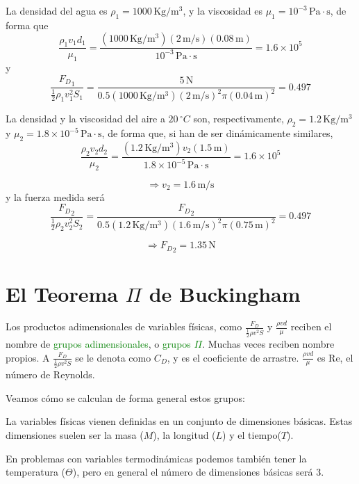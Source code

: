 		La densidad del agua es $\rho_{1}=1000\,\text{Kg}/\text{m}^{3}$,
		y la viscosidad es $\mu_{1}=10^{-3}\,\text{Pa}\cdot\text{s}$, de
		forma que 
		\[
		\frac{\rho_{1}v_{1}d_{1}}{\mu_{1}}=\frac{(1000\,\text{Kg}/\text{m}^{3})(2\,\text{m/s})(0.08\,\text{m})}{10^{-3}\,\text{Pa}\cdot\text{s}}=1.6\times10^{5}
		\]
		y 
		\[
		\frac{{F_{D}}_{1}}{\frac{1}{2}\rho_{1}v_{1}^{2}S_{1}}=\frac{5\,\text{N}}{0.5(1000\,\text{Kg}/\text{m}^{3})(2\,\text{m/s})^{2}\pi(0.04\,\text{m})^{2}}=0.497
		\]

		La densidad y la viscosidad del aire a $20\,^{\circ}C$ son, respectivamente,
		$\rho_{2}=1.2\,\text{Kg}/\text{m}^{3}$ y $\mu_{2}=1.8\times10^{-5}\,\text{Pa}\cdot\text{s}$,
		de forma que, si han de ser dinámicamente similares, 
		\[
		\frac{\rho_{2}v_{2}d_{2}}{\mu_{2}}=\frac{(1.2\,\text{Kg}/\text{m}^{3})v_{2}(1.5\,\text{m})}{1.8\times10^{-5}\,\text{Pa}\cdot\text{s}}=1.6\times10^{5}
		\]
		
		\[
		\Rightarrow v_{2}=1.6\,\text{m/s}
		\]
		y la fuerza medida será 
		\[
		\frac{{F_{D}}_{2}}{\frac{1}{2}\rho_{2}v_{2}^{2}S_{2}}=\frac{{F_{D}}_{2}}{0.5(1.2\,\text{Kg}/\text{m}^{3})(1.6\,\text{m/s})^{2}\pi(0.75\,\text{m})^{2}}=0.497
		\]
		
		\[
		\Rightarrow{F_{D}}_{2}=1.35\,\text{N}
		\]
	

\section{El Teorema $\Pi$ de Buckingham}

	
	Los productos adimensionales de variables físicas, como $\frac{F_{D}}{\frac{1}{2}\rho v^{2}S}$
	y $\frac{\rho vd}{\mu}$ reciben el nombre de \textcolor{green}{grupos
		adimensionales}, o \textcolor{green}{grupos $\Pi$}. Muchas veces
	reciben nombre propios. A $\frac{F_{D}}{\frac{1}{2}\rho v^{2}S}$
	se le denota como $C_{D}$, y es el coeficiente de arrastre. $\frac{\rho vd}{\mu}$
	es $\text{Re}$, el número de Reynolds.
	
	Veamos cómo se calculan de forma general estos grupos:
	
	La variables físicas vienen definidas en un conjunto de dimensiones
	básicas. Estas dimensiones suelen ser la masa ($M$), la longitud
	($L$) y el tiempo($T$). 
	
	{\footnotesize{}En problemas con variables termodinámicas podemos
		también tener la temperatura ($\Theta$), pero en general el número
		de dimensiones básicas será 3.}{\footnotesize\par}
	
